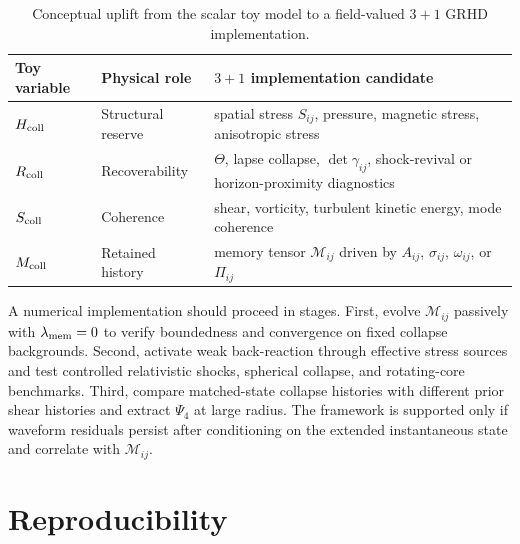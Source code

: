\documentclass[11pt]{article}
\begin{document}
\begin{table}[t]
\centering
\caption{Conceptual uplift from the scalar toy model to a field-valued \(3+1\) GRHD implementation.}
\begin{tabular}{lll}
\toprule
Toy variable & Physical role & \(3+1\) implementation candidate \\
\midrule
\(H_{\rm coll}\) & Structural reserve & spatial stress \(S_{ij}\), pressure, magnetic stress, anisotropic stress \\
\(R_{\rm coll}\) & Recoverability & \(\Theta\), lapse collapse, \(\det\gamma_{ij}\), shock-revival or horizon-proximity diagnostics \\
\(S_{\rm coll}\) & Coherence & shear, vorticity, turbulent kinetic energy, mode coherence \\
\(M_{\rm coll}\) & Retained history & memory tensor \(\mathcal{M}_{ij}\) driven by \(A_{ij}\), \(\sigma_{ij}\), \(\omega_{ij}\), or \(\Pi_{ij}\) \\
\bottomrule
\end{tabular}
\label{tab:grhd_uplift}
\end{table}

A numerical implementation should proceed in stages. First, evolve \(\mathcal{M}_{ij}\) passively with \(\lambda_{\rm mem}=0\) to verify boundedness and convergence on fixed collapse backgrounds. Second, activate weak back-reaction through effective stress sources and test controlled relativistic shocks, spherical collapse, and rotating-core benchmarks. Third, compare matched-state collapse histories with different prior shear histories and extract \(\Psi_4\) at large radius. The framework is supported only if waveform residuals persist after conditioning on the extended instantaneous state and correlate with \(\mathcal{M}_{ij}\).

\section{Reproducibility}
\label{sec:reproducibility}
\end{document}
